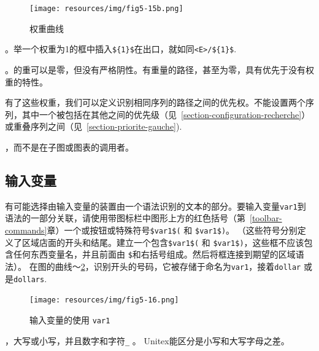 \begin{figure}[h!]
\begin{center}
\texttt{[image: resources/img/fig5-15b.png]}
\caption{权重曲线\label{fig-weights-in-graphs}}
\end{center}
\end{figure}

\bigskip
{}。举一个权重为1的框中插入\verb+${1}$+在出口，就如同\verb+<E>/${1}$+.

\bigskip
{}。的重可以是零，但没有严格阴性。有重量的路径，甚至为零，具有优先于没有权重的特性。

\bigskip
\noindent 有了这些权重，我们可以定义识别相同序列的路径之间的优先权。不能设置两个序列，其中一个被包括在其他之间的优先级（见~\ref{section-configuration-recherche}）或重叠序列之间（见~\ref{section-priorite-gauche}).

\bigskip
{}，而不是在子图或图表的调用者。


\subsection{输入变量}
\label{section-using-variables}
\index{\verb+$+$}

有可能选择由输入变量的装置由一个语法识别的文本的部分。要输入变量\verb+var1+到语法的一部分关联，请使用带图标栏中图形上方的红色括号（第~\ref{toolbar-commands}章）一个或按钮或特殊符号\verb+$var1$(+ 和
\verb+$var1$)+。 （这些符号分别定义了区域店面的开头和结尾。建立一个包含\verb+$var1$(+ 和 \verb+$var1$)+，这些框不应该包含任何东西变量名，并且前面由 \verb+$+和右括号组成。然后将框连接到期望的区域语法）。 
在图的曲线〜\ref{fig-using-variable}，识别开头的号码，它被存储于命名为\verb+var1+，接着\verb+dollar+ 或是\verb+dollars+.

\begin{figure}[h]
\begin{center}
\texttt{[image: resources/img/fig5-16.png]}
\caption{输入变量的使用
\texttt{var1}\label{fig-using-variable}}
\end{center}
\end{figure}

\bigskip
{}，大写或小写，并且数字和字符\verb+_+ 。
\index{\verb+_+}Unitex能区分是小写和大写字母之差。

